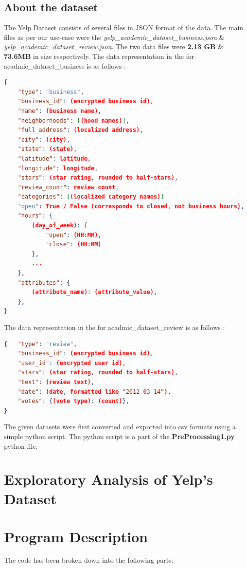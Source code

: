 \documentclass[paper=a4, fontsize=11pt]{scrartcl} %
\numberwithin{equation}{section} %
\numberwithin{figure}{section} %
\numberwithin{table}{section} %
\begin{document}
\subsection{About the dataset}
The Yelp Dataset consists of several files in JSON format of the data. The main files as per our use-case were the \textit{yelp\_academic\_dataset\_business.json} \& \textit{yelp\_academic\_dataset\_review.json}. The two data files were \textbf{2.13 GB} \& \textbf{73.6MB} in size respectively. The data representation in the for acadmic\_dataset\_business is as follows : \\
\begin{lstlisting}[language=json]
{
    "type": "business",
    "business_id": (encrypted business id),
    "name": (business name),
    "neighborhoods": [(hood names)],
    "full_address": (localized address),
    "city": (city),
    "state": (state),
    "latitude": latitude,
    "longitude": longitude,
    "stars": (star rating, rounded to half-stars),
    "review_count": review count,
    "categories": [(localized category names)]
    "open": True / False (corresponds to closed, not business hours),
    "hours": {
        (day_of_week): {
            "open": (HH:MM),
            "close": (HH:MM)
        },
        ...
    },
    "attributes": {
        (attribute_name): (attribute_value),
    },
}
\end{lstlisting}
The data representation in the for acadmic\_dataset\_review is as follows : \\
\begin{lstlisting}[language=json]
{   "type": "review",
    "business_id": (encrypted business id),
    "user_id": (encrypted user id),
    "stars": (star rating, rounded to half-stars),
    "text": (review text),
    "date": (date, formatted like "2012-03-14"),
    "votes": {(vote type): (count)},
}
\end{lstlisting}
The given datasets were first converted and exported into csv formats using a simple python script. The python script is a part of the \textbf{PreProcessing1.py} python file.

\section{Exploratory Analysis of Yelp's Dataset}

\section{Program Description}
The code has been broken down into the following parts:
\end{document}
